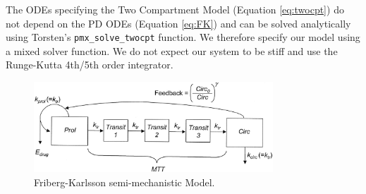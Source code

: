 \documentclass[10pt, reqno, oneside]{amsbook}
\numberwithin{equation}{chapter}
\numberwithin{figure}{chapter}
\numberwithin{table}{chapter}
\theoremstyle{remark}
\begin{document}
The ODEs specifying the Two Compartment Model
(Equation \eqref{eq:twocpt}) do not depend on the PD ODEs
(Equation \eqref{eq:FK}) and can be solved analytically
using Torsten's \texttt{pmx_solve_twocpt} function. We
therefore specify our model using a mixed solver function. We do not
expect our system to be stiff and use the Runge-Kutta 4th/5th order
integrator.

\begin{figure}[htbp]
\centering
\includegraphics[width=0.8\textwidth]{./graphics/neutrophilModel.jpg}
\caption{\label{FK_model}
Friberg-Karlsson semi-mechanistic Model.}
\end{figure}
\end{document}
